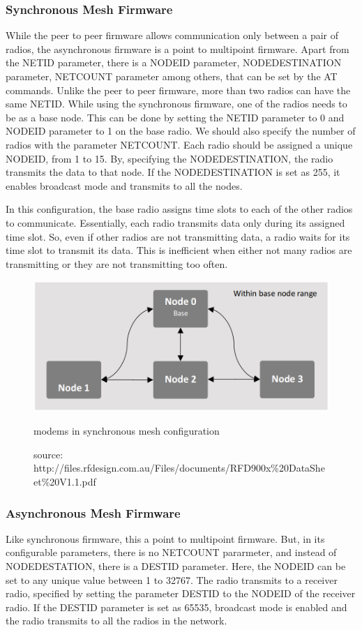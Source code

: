 \subsubsection{Synchronous Mesh Firmware}
While the peer to peer firmware allows communication only between a pair of radios, the asynchronous firmware is a point to multipoint firmware. Apart from the NETID parameter, there is a NODEID parameter, NODEDESTINATION parameter, NETCOUNT parameter among others, that can be set by the AT commands. Unlike the peer to peer firmware, more than two radios can have the same NETID. While using the synchronous firmware, one of the radios needs to be as a base node. This can be done by setting the NETID parameter to 0 and NODEID parameter to 1 on the base radio. We should also specify the number of radios with the parameter NETCOUNT. Each radio should be assigned a unique NODEID, from 1 to 15. By, specifying the NODEDESTINATION, the radio transmits the data to that node. If the NODEDESTINATION is set as 255, it enables broadcast mode and transmits to all the nodes.

In this configuration, the base radio assigns time slots to each of the other radios to communicate. Essentially, each radio transmits data only during its assigned time slot. So, even if other radios are not transmitting data, a radio waits for its time slot to transmit its data. This is inefficient when either not many radios are transmitting or they are not transmitting too often.

\begin{figure}[h]
	\centering
	\includegraphics[scale=0.4]{Pictures/sync.png}
	\caption{modems in synchronous mesh configuration}
	\label{fig: rfdsync}
	\caption*{source: http://files.rfdesign.com.au/Files/documents/RFD900x\%20DataSheet\%20V1.1.pdf}
\end{figure}

\subsubsection{Asynchronous Mesh Firmware}
Like synchronous firmware, this a point to multipoint firmware. But, in its configurable parameters, there is no NETCOUNT pararmeter, and instead of NODEDESTATION, there is a DESTID parameter. Here, the NODEID can be set to any unique value between 1 to 32767. The radio transmits to a receiver radio, specified by setting the parameter DESTID to the NODEID of the receiver radio. If the DESTID parameter is set as 65535, broadcast mode is enabled and the radio transmits to all the radios in the network.

